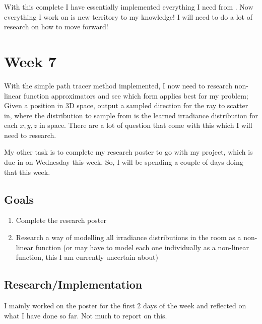 \documentclass[conference]{IEEEtran}
\begin{document}
With this complete I have essentially implemented everything I need from \cite{dahm2017learning}. Now everything I work on is new territory to my knowledge! I will need to do a lot of research on how to move forward!

\section*{Week 7}

With the \cite{dahm2017learning} simple path tracer method implemented, I now need to research non-linear function approximators and see which form applies best for my problem; Given a position in 3D space, output a sampled direction for the ray to scatter in, where the distribution to sample from is the learned irradiance distribution for each $x,y,z$ in space. There are a lot of question that come with this which I will need to research.

My other task is to complete my research poster to go with my project, which is due in on Wednesday this week. So, I will be spending a couple of days doing that this week.

\subsection{Goals}
\begin{enumerate}

\item Complete the research poster

\item Research a way of modelling all irradiance distributions in the room as a non-linear function (or may have to model each one individually as a non-linear function, this I am currently uncertain about)

\end{enumerate}

\subsection{Research/Implementation}

I mainly worked on the poster for the first 2 days of the week and reflected on what I have done so far. Not much to report on this.



\end{document}

